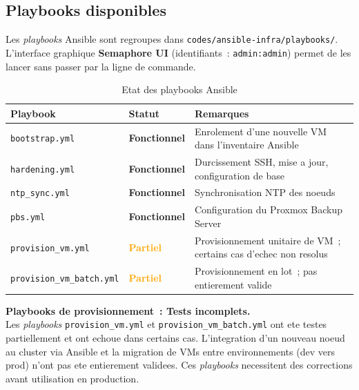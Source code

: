 \documentclass[a4paper,11pt]{article}
\newenvironment{warnbox}{%
  \begin{mdframed}[linecolor=orange,backgroundcolor=orange!8,linewidth=1pt,
    leftmargin=0pt,rightmargin=0pt,innertopmargin=6pt,innerbottommargin=6pt]
}{%
  \end{mdframed}
}
\begin{document}
\subsection{Playbooks disponibles}

Les \textit{playbooks} Ansible sont regroupes dans \texttt{codes/ansible-infra/playbooks/}.
L'interface graphique \textbf{Semaphore UI} (identifiants~: \texttt{admin:admin})
permet de les lancer sans passer par la ligne de commande.

\begin{table}[H]
  \caption{Etat des playbooks Ansible}
  \centering
  \begin{tabular}{L{4.5cm}L{3cm}L{6cm}}
    \toprule
    \textbf{Playbook} & \textbf{Statut} & \textbf{Remarques} \\
    \midrule
    \texttt{bootstrap.yml}   & \textcolor{vert}{\textbf{Fonctionnel}}  & Enrolement d'une nouvelle VM dans l'inventaire Ansible \\
    \texttt{hardening.yml}   & \textcolor{vert}{\textbf{Fonctionnel}}  & Durcissement SSH, mise a jour, configuration de base \\
    \texttt{ntp\_sync.yml}   & \textcolor{vert}{\textbf{Fonctionnel}}  & Synchronisation NTP des noeuds \\
    \texttt{pbs.yml}         & \textcolor{vert}{\textbf{Fonctionnel}}  & Configuration du Proxmox Backup Server \\
    \texttt{provision\_vm.yml} & \textcolor{orange}{\textbf{Partiel}} & Provisionnement unitaire de VM~; certains cas d'echec non resolus \\
    \texttt{provision\_vm\_batch.yml} & \textcolor{orange}{\textbf{Partiel}} & Provisionnement en lot~; pas entierement valide \\
    \bottomrule
  \end{tabular}
\end{table}

\begin{warnbox}
  \textbf{Playbooks de provisionnement~: Tests incomplets.}\\
  Les \textit{playbooks} \texttt{provision\_vm.yml} et \texttt{provision\_vm\_batch.yml}
  ont ete testes partiellement et ont echoue dans certains cas.
  L'integration d'un nouveau noeud au cluster via Ansible et la migration de VMs
  entre environnements (dev vers prod) n'ont pas ete entierement validees.
  Ces \textit{playbooks} necessitent des corrections avant utilisation en production.
\end{warnbox}
\end{document}
